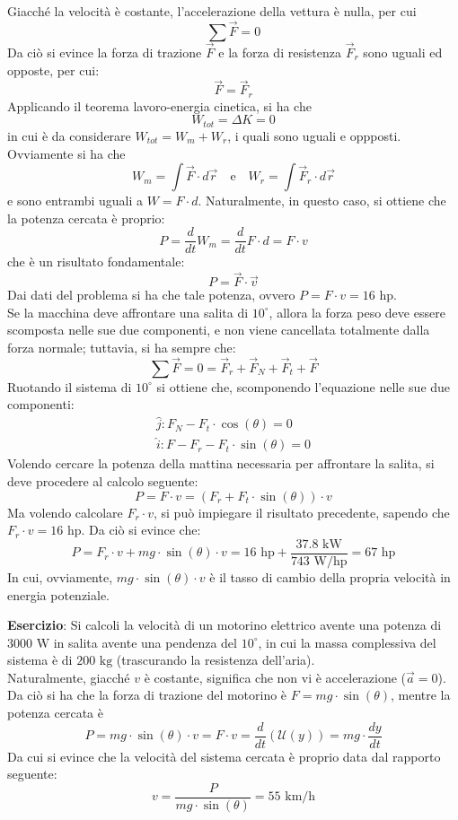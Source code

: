 \documentclass[a4paper]{extarticle}
\begin{document}
\noindent
Giacché la velocità è costante, l'accelerazione della vettura è nulla, per cui
\[\sum \vec F = 0\]
Da ciò si evince la forza di trazione $\vec F$ e la forza di resistenza $\vec F_r$ sono uguali ed opposte, per cui:
\[\vec F = \vec F_r\]
Applicando il teorema lavoro-energia cinetica, si ha che
\[W_{tot}=\Delta K=0\]
in cui è da considerare $W_{tot}=W_m+W_r$, i quali sono uguali e oppposti. Ovviamente si ha che
\[W_m = \int \vec F \cdot d \vec r \hspace{1em} \text{e} \hspace{1em} W_r = \int \vec F_r \cdot d \vec r\]
e sono entrambi uguali a $W=F \cdot d$. Naturalmente, in questo caso, si ottiene che la potenza cercata è proprio:
\[P=\frac{d}{dt}W_m=\frac{d}{dt}F \cdot d = F \cdot v\]
che è un risultato fondamentale:
\[\boxed{P=\vec F \cdot \vec v}\]
Dai dati del problema si ha che tale potenza, ovvero $P=F \cdot v = 16 \text{ hp}$.\\
Se la macchina deve affrontare una salita di $10^\circ$, allora la forza peso deve essere scomposta nelle sue due componenti, e non viene cancellata totalmente dalla forza normale; tuttavia, si ha sempre che:
\[\sum \vec F = 0 = \vec F_r + \vec F_N + \vec F_t + \vec F\]
Ruotando il sistema di $10^\circ$ si ottiene che, scomponendo l'equazione nelle sue due componenti:
\begin{align*}
    \hat{j}:F_N - F_t \cdot \cos(\theta) = 0\\
    \hat{i}:F - F_r  - F_t \cdot \sin(\theta) = 0
\end{align*}
Volendo cercare la potenza della mattina necessaria per affrontare la salita, si deve procedere al calcolo seguente:
\[P=F \cdot v=(F_r + F_t \cdot \sin(\theta)) \cdot v\]
Ma volendo calcolare $F_r \cdot v$, si può impiegare il risultato precedente, sapendo che $F_r \cdot v = 16 \text{ hp}$. Da ciò si evince che:
\[P=F_r \cdot v + mg \cdot \sin(\theta) \cdot v = 16 \text{ hp} + \frac{37.8 \text{ kW}}{743 \text{ W/hp}} = 67 \text{ hp}\]
In cui, ovviamente, $mg \cdot \sin(\theta) \cdot v$ è il tasso di cambio della propria velocità in energia potenziale.

\vspace{1em}
\noindent
\textbf{Esercizio}: Si calcoli la velocità di un motorino elettrico avente una potenza di $3000 \text{ W}$ in salita avente una pendenza del $10^\circ$, in cui la massa complessiva del sistema è di $200 \text{ kg}$ (trascurando la resistenza dell'aria).\\
Naturalmente, giacché $v$ è costante, significa che non vi è accelerazione ($\vec a=0$). Da ciò si ha che la forza di trazione del motorino è $F=mg \cdot \sin(\theta)$, mentre la potenza cercata è
\[P = mg \cdot \sin(\theta) \cdot v = F \cdot v = \frac{d}{dt} \left(\mathcal{U}(y)\right) = mg \cdot \frac{dy}{dt}\]
Da cui si evince che la velocità del sistema cercata è proprio data dal rapporto seguente:
\[v = \frac{P}{mg \cdot \sin(\theta)} = 55 \text{ km/h}\]
\end{document}
